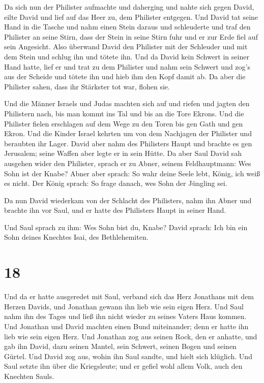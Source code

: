  Da sich nun der Philister aufmachte und daherging und
nahte sich gegen David, eilte David und lief auf das Heer zu, dem
Philister entgegen.  Und David tat seine Hand in die
Tasche und nahm einen Stein daraus und schleuderte und traf den
Philister an seine Stirn, dass der Stein in seine Stirn fuhr und er zur
Erde fiel auf sein Angesicht.  Also überwand David den
Philister mit der Schleuder und mit dem Stein und schlug ihn und tötete
ihn. Und da David kein Schwert in seiner Hand hatte, 
lief er und trat zu dem Philister und nahm sein Schwert und zog's aus
der Scheide und tötete ihn und hieb ihm den Kopf damit ab. Da aber die
Philister sahen, dass ihr Stärkster tot war, flohen sie.

 Und die Männer Israels und Judas machten sich auf und
riefen und jagten den Philistern nach, bis man kommt ins Tal und bis an
die Tore Ekrons. Und die Philister fielen erschlagen auf dem Wege zu den
Toren bis gen Gath und gen Ekron.  Und die Kinder Israel
kehrten um von dem Nachjagen der Philister und beraubten ihr Lager.
 David aber nahm des Philisters Haupt und brachte es gen
Jerusalem; seine Waffen aber legte er in sein Hütte.  Da
aber Saul David sah ausgehen wider den Philister, sprach er zu Abner,
seinem Feldhauptmann: Wes Sohn ist der Knabe? Abner aber sprach: So wahr
deine Seele lebt, König, ich weiß es nicht.  Der König
sprach: So frage danach, wes Sohn der Jüngling sei.

 Da nun David wiederkam von der Schlacht des Philisters,
nahm ihn Abner und brachte ihn vor Saul, und er hatte des Philisters
Haupt in seiner Hand.

 Und Saul sprach zu ihm: Wes Sohn bist du, Knabe? David
sprach: Ich bin ein Sohn deines Knechtes Isai, des Bethlehemiten.

\hypertarget{section-17}{%
\section{18}\label{section-17}}

 Und da er hatte ausgeredet mit Saul, verband sich das
Herz Jonathans mit dem Herzen Davids, und Jonathan gewann ihn lieb wie
sein eigen Herz.  Und Saul nahm ihn des Tages und ließ ihn
nicht wieder zu seines Vaters Haus kommen.  Und Jonathan
und David machten einen Bund miteinander; denn er hatte ihn lieb wie
sein eigen Herz.  Und Jonathan zog aus seinen Rock, den er
anhatte, und gab ihn David, dazu seinen Mantel, sein Schwert, seinen
Bogen und seinen Gürtel.  Und David zog aus, wohin ihn
Saul sandte, und hielt sich klüglich. Und Saul setzte ihn über die
Kriegsleute; und er gefiel wohl allem Volk, auch den Knechten Sauls.

